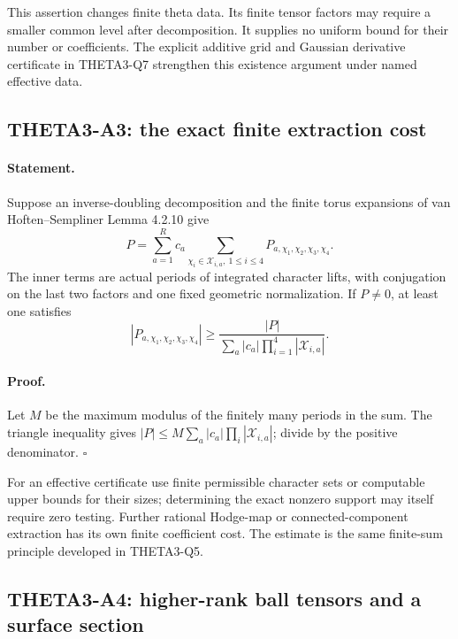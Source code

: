 This assertion changes finite theta data. Its finite tensor factors
may require a smaller common level after decomposition. It supplies
no uniform bound for their number or coefficients. The explicit
additive grid and Gaussian derivative certificate in THETA3-Q7
strengthen this existence argument under named effective data.

\subsection{THETA3-A3: the exact finite extraction cost}\label{A3}

\paragraph{Statement.}
Suppose an inverse-doubling decomposition and the finite torus
expansions of van Hoften--Sempliner Lemma 4.2.10 give
\[
 P=\sum_{a=1}^{R}c_a
       \sum_{\chi_i\in\mathcal X_{i,a},\ 1\leq i\leq4}
                       P_{a,\chi_1,\chi_2,\chi_3,\chi_4}.
\]
The inner terms are actual periods of integrated character lifts, with
conjugation on the last two factors and one fixed geometric
normalization. If $P\ne0$, at least one satisfies
\[
 |P_{a,\chi_1,\chi_2,\chi_3,\chi_4}|
 \geq \frac{|P|}{\sum_a|c_a|\prod_{i=1}^4|\mathcal X_{i,a}|}.
\]

\paragraph{Proof.}
Let $M$ be the maximum modulus of the finitely many periods in the
sum. The triangle inequality gives
$|P|\leq M\sum_a|c_a|\prod_i|\mathcal X_{i,a}|$; divide by the
positive denominator. $\square$

For an effective certificate use finite permissible character sets or
computable upper bounds for their sizes; determining the exact nonzero
support may itself require zero testing. Further rational Hodge-map or
connected-component extraction has its own finite coefficient cost.
The estimate is the same finite-sum principle developed in THETA3-Q5.

\subsection{THETA3-A4: higher-rank ball tensors and a surface section}\label{A4}

